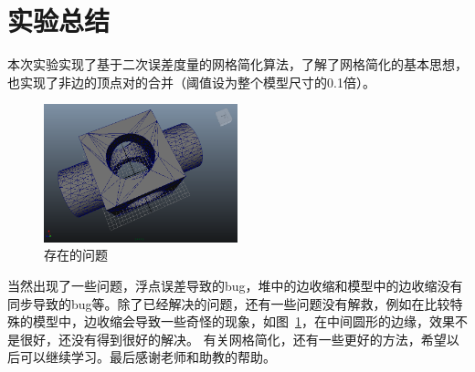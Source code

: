 \documentclass{article}
\begin{document}
\section{实验总结}
本次实验实现了基于二次误差度量的网格简化算法，了解了网格简化的基本思想，也实现了非边的顶点对的合并（阈值设为整个模型尺寸的0.1倍）。\par
\begin{figure}[H]
  \centering%
    \includegraphics[width=0.5\textwidth]{7.png}
  \caption{存在的问题}
  \label{fig:cp}
\end{figure}
当然出现了一些问题，浮点误差导致的bug，堆中的边收缩和模型中的边收缩没有同步导致的bug等。除了已经解决的问题，还有一些问题没有解救，例如在比较特殊的模型中，边收缩会导致一些奇怪的现象，如图~\ref{fig:cp}，在中间圆形的边缘，效果不是很好，还没有得到很好的解决。
有关网格简化，还有一些更好的方法，希望以后可以继续学习。最后感谢老师和助教的帮助。
\newpage


\end{document}
